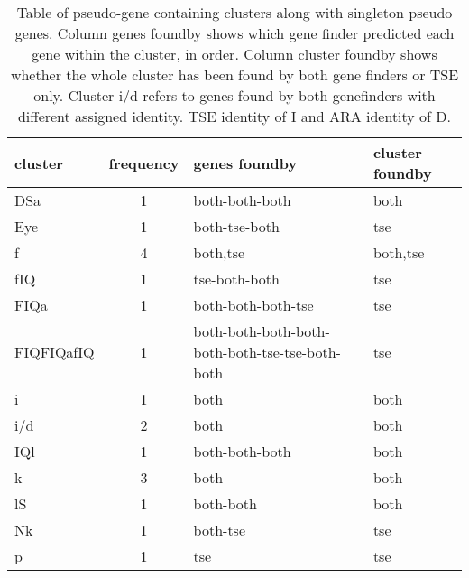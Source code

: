 \documentclass[table,
12pt, %
a4paper, %
oneside, %
headinclude,footinclude, %
BCOR5mm, %
]{scrartcl}
\begin{document}
\begin{table}[htbp]
  \caption{Table of pseudo-gene containing clusters along with singleton pseudo genes. Column genes foundby shows which gene finder predicted each gene within the cluster, in order. Column cluster foundby shows whether the whole cluster has been found by both gene finders or TSE only. Cluster i/d refers to genes found by both genefinders with different assigned identity. TSE identity of I and ARA identity of D.}
  \begin{adjustbox}{width=\textwidth,center}
    \begin{tabular}{|l|c|l|l|}
      \hline
      cluster    & frequency & genes foundby                                   & cluster foundby \\
      \hline\hline
      DSa        & 1         & both-both-both                                  & both            \\
      Eye        & 1         & both-tse-both                                   & tse             \\
      f          & 4         & both,tse                                        & both,tse        \\
      fIQ        & 1         & tse-both-both                                   & tse             \\
      FIQa       & 1         & both-both-both-tse                              & tse             \\
      FIQFIQafIQ & 1         & both-both-both-both-both-both-tse-tse-both-both & tse             \\
      i          & 1         & both                                            & both            \\
      i/d        & 2         & both                                            & both            \\
      IQl        & 1         & both-both-both                                  & both            \\
      k          & 3         & both                                            & both            \\
      lS         & 1         & both-both                                       & both            \\
      Nk         & 1         & both-tse                                        & tse             \\
      p          & 1         & tse                                             & tse             \\

\end{tabular}
\end{adjustbox}
\end{table}
\end{document}
